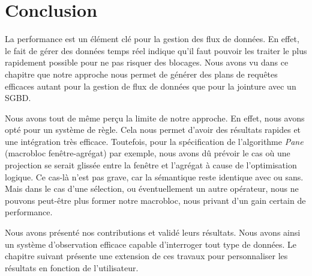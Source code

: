 \section{Conclusion}\label{sec:valid:perfs:conclusion}
La performance est un élément clé pour la gestion des flux de données. En effet, le fait de gérer des données temps réel indique qu'il faut pouvoir les traiter le plus rapidement possible pour ne pas risquer des blocages. Nous avons vu dans ce chapitre que notre approche nous permet de générer des plans de requêtes efficaces autant pour la gestion de flux de données que pour la jointure avec un SGBD.

Nous avons tout de même perçu la limite de notre approche. En effet, nous avons opté pour un système de règle. Cela nous permet d'avoir des résultats rapides et une intégration très efficace. Toutefois, pour la spécification de l'algorithme \textit{Pane} (macrobloc fenêtre-agrégat) par exemple, nous avons dû prévoir le cas où une projection se serait glissée entre la fenêtre et l'agrégat à cause de l'optimisation logique. Ce cas-là n'est pas grave, car la sémantique reste identique avec ou sans. Mais dans le cas d'une sélection, ou éventuellement un autre opérateur, nous ne pouvons peut-être plus former notre macrobloc, nous privant d'un gain certain de performance.

Nous avons présenté nos contributions et validé leurs résultats. Nous avons ainsi un système d'observation efficace capable d'interroger tout type de données. Le chapitre suivant présente une extension de ces travaux pour personnaliser les résultats en fonction de l'utilisateur.
